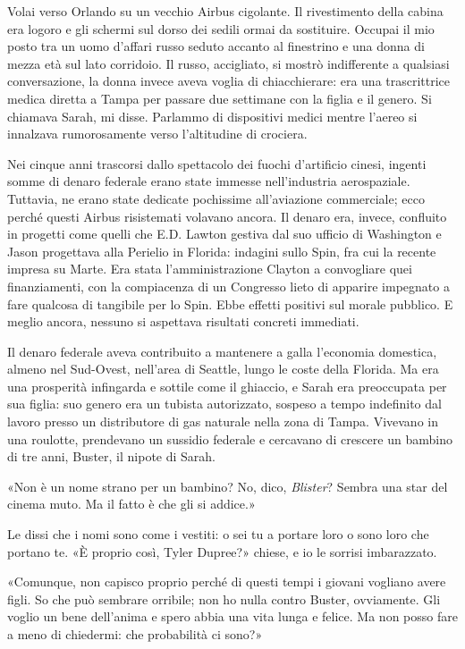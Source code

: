 \separatorefiori

Volai verso Orlando su un vecchio Airbus cigolante. Il rivestimento
della cabina era logoro e gli schermi sul dorso dei sedili ormai da
sostituire. Occupai il mio posto tra un uomo d'affari russo seduto
accanto al finestrino e una donna di mezza età sul lato corridoio. Il
russo, accigliato, si mostrò indifferente a qualsiasi conversazione, la
donna invece aveva voglia di chiacchierare: era una trascrittrice medica
diretta a Tampa per passare due settimane con la figlia e il genero. Si
chiamava Sarah, mi disse. Parlammo di dispositivi medici mentre l'aereo
si innalzava rumorosamente verso l'altitudine di crociera.

Nei cinque anni trascorsi dallo spettacolo dei fuochi d'artificio
cinesi, ingenti somme di denaro federale erano state immesse
nell'industria aerospaziale. Tuttavia, ne erano state dedicate
pochissime all'aviazione commerciale; ecco perché questi Airbus
risistemati volavano ancora. Il denaro era, invece, confluito in
progetti come quelli che E.D. Lawton gestiva dal suo ufficio di
Washington e Jason progettava alla Perielio in Florida: indagini sullo
Spin, fra cui la recente impresa su Marte. Era stata l'amministrazione
Clayton a convogliare quei finanziamenti, con la compiacenza di un
Congresso lieto di apparire impegnato a fare qualcosa di tangibile per
lo Spin. Ebbe effetti positivi sul morale pubblico. E meglio ancora,
nessuno si aspettava risultati concreti immediati.

Il denaro federale aveva contribuito a mantenere a galla l'economia
domestica, almeno nel Sud-Ovest, nell'area di Seattle, lungo le coste
della Florida. Ma era una prosperità infingarda e sottile come il
ghiaccio, e Sarah era preoccupata per sua figlia: suo genero era un
tubista autorizzato, sospeso a tempo indefinito dal lavoro presso un
distributore di gas naturale nella zona di Tampa. Vivevano in una
roulotte, prendevano un sussidio federale e cercavano di crescere un
bambino di tre anni, Buster, il nipote di Sarah.

«Non è un nome strano per un bambino? No, dico, \emph{Blister}? Sembra
una star del cinema muto. Ma il fatto è che gli si addice.»

Le dissi che i nomi sono come i vestiti: o sei tu a portare loro o sono
loro che portano te. «È proprio così, Tyler Dupree?» chiese, e io le
sorrisi imbarazzato.

«Comunque, non capisco proprio perché di questi tempi i giovani vogliano
avere figli. So che può sembrare orribile; non ho nulla contro Buster,
ovviamente. Gli voglio un bene dell'anima e spero abbia una vita lunga e
felice. Ma non posso fare a meno di chiedermi: che probabilità ci sono?»

